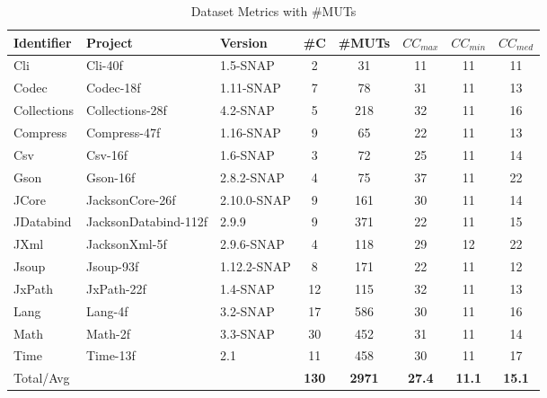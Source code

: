 \begin{table}[t]
\centering
\caption{Dataset Metrics with \#MUTs}
\label{tab:dataset}
\begin{tabular}{l l l ccccc}
\toprule
\textbf{Identifier} & \textbf{Project} & \textbf{Version} & \textbf{\#C} & \textbf{\#MUTs} & \textbf{$CC_{max}$} & \textbf{$CC_{min}$} & \textbf{$CC_{med}$} \\
\midrule
Cli & Cli-40f & 1.5-SNAP & 2 & 31 & 11 & 11 & 11 \\
Codec & Codec-18f & 1.11-SNAP & 7 & 78 & 31 & 11 & 13 \\
Collections & Collections-28f & 4.2-SNAP & 5 & 218 & 32 & 11 & 16 \\
Compress & Compress-47f & 1.16-SNAP & 9 & 65 & 22 & 11 & 13 \\
Csv & Csv-16f & 1.6-SNAP & 3 & 72 & 25 & 11 & 14 \\
Gson & Gson-16f & 2.8.2-SNAP & 4 & 75 & 37 & 11 & 22 \\
JCore & JacksonCore-26f & 2.10.0-SNAP & 9 & 161 & 30 & 11 & 14 \\
JDatabind & JacksonDatabind-112f & 2.9.9 & 9 & 371 & 22 & 11 & 15 \\
JXml & JacksonXml-5f & 2.9.6-SNAP & 4 & 118 & 29 & 12 & 22 \\
Jsoup & Jsoup-93f & 1.12.2-SNAP & 8 & 171 & 22 & 11 & 12 \\
JxPath & JxPath-22f & 1.4-SNAP & 12 & 115 & 32 & 11 & 13 \\
Lang & Lang-4f & 3.2-SNAP & 17 & 586 & 30 & 11 & 16 \\
Math & Math-2f & 3.3-SNAP & 30 & 452 & 31 & 11 & 14 \\
Time & Time-13f & 2.1 & 11 & 458 & 30 & 11 & 17 \\
\midrule
Total/Avg & & & \textbf{130} & \textbf{2971}  & \textbf{27.4}  & \textbf{11.1}  & \textbf{15.1} \\
\bottomrule
\end{tabular}
\end{table}